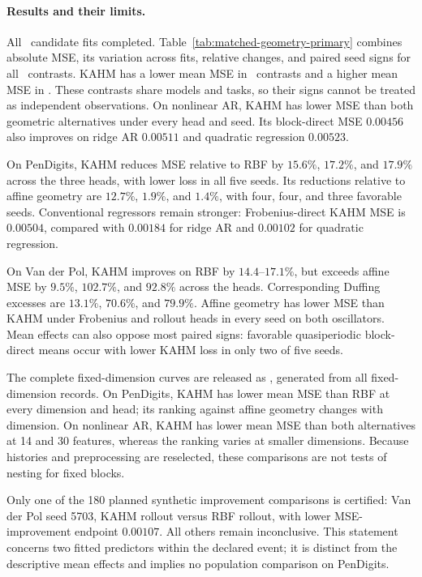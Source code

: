 

\paragraph{Results and their limits.}
All \MatchedCandidates\ candidate fits completed. Table~\ref{tab:matched-geometry-primary}
combines absolute MSE, its variation across fits, relative changes, and paired
seed signs for all \MatchedComparisons\ contrasts. KAHM has a lower mean MSE
in \MatchedImproved\ contrasts and a higher mean MSE
in \MatchedDegraded. These contrasts share models and tasks, so their signs
cannot be treated as independent observations.
On nonlinear AR, KAHM has lower MSE than both geometric alternatives under every head and
seed. Its block-direct MSE $0.00456$ also improves on ridge AR $0.00511$ and
quadratic regression $0.00523$.

On PenDigits, KAHM reduces MSE relative to RBF by $15.6\%$, $17.2\%$, and
$17.9\%$ across the three heads, with lower loss in all five seeds. Its
reductions relative to affine geometry are $12.7\%$, $1.9\%$, and $1.4\%$,
with four, four, and three favorable seeds. Conventional regressors remain
stronger: Frobenius-direct KAHM MSE is $0.00504$, compared with $0.00184$
for ridge AR and $0.00102$ for quadratic regression.

On Van der Pol, KAHM improves on RBF by $14.4$--$17.1\%$, but exceeds affine
MSE by $9.5\%$, $102.7\%$, and $92.8\%$ across the heads. Corresponding
Duffing excesses are $13.1\%$, $70.6\%$, and $79.9\%$. Affine geometry has
lower MSE than KAHM under Frobenius and rollout heads in
every seed on both oscillators.
Mean effects can also oppose most paired signs: favorable quasiperiodic
block-direct means occur with lower KAHM loss in only two of five seeds.

The complete fixed-dimension curves are released as
, generated from all
fixed-dimension records. On PenDigits, KAHM has lower mean MSE than RBF at
every dimension and head;
its ranking against affine geometry changes with dimension. On nonlinear AR,
KAHM has lower mean MSE than both alternatives at 14 and 30 features, whereas
the ranking varies at smaller dimensions.
Because histories and preprocessing are reselected, these comparisons are
not tests of nesting for fixed blocks.

Only one of the 180 planned synthetic improvement comparisons is certified:
Van der Pol seed 5703, KAHM rollout versus RBF rollout, with lower MSE-improvement
endpoint $0.00107$. All others remain inconclusive. This statement concerns
two fitted predictors within the declared event; it is distinct from the
descriptive mean effects and implies no population comparison on PenDigits.
